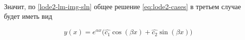 Значит, по \ref{lode2-lm-img-sln} общее решение \eqref{eq:lode2-cases} в третьем
случае будет иметь вид

\begin{align*}
  y(x) = e^{\alpha x} \Big(
    \widehat{c_{1}} \cos (\beta x) +
    \widehat{c_{2}} \sin (\beta x)
  \Big)
\end{align*}



